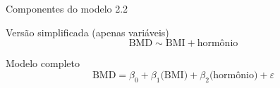 \documentclass{beamer}
\begin{document}
\begin{frame}{\small Componentes do modelo 2.2}
  \begin{block}{\footnotesize Versão simplificada (apenas variáveis)}
    \footnotesize
    \begin{displaymath}
      \text{BMD} \sim \text{BMI} + \text{hormônio}
    \end{displaymath}
  \end{block}
  \bigskip
  \bigskip
  \begin{block}{Modelo completo}
    \begin{displaymath}
      \text{BMD} =\beta_0 + \beta_1 \text{(BMI)} + \beta_2 \text{(hormônio)} +\varepsilon
    \end{displaymath}
  \end{block}
  \vfill
\end{frame}
\end{document}
